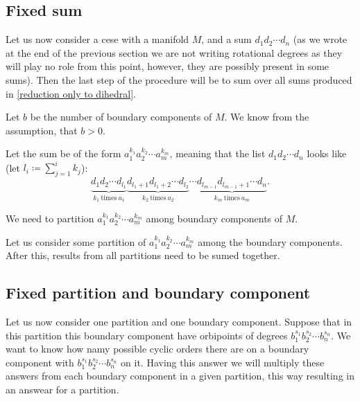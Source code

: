 \subsection{Fixed sum}

Let us now consider a cese with a manifold $M$, and a sum $d_1d_2\cdots d_n$ (as we wrote 
at the end of the previous section we are not writing rotational degrees as 
they will play no role from this point, however, they are possibly present in some sums). 
Then the last step of the procedure will be to sum over all sums produced in 
\ref{reduction only to dihedral}. 



Let $b$ be the number of boundary components of $M$. We know from the assumption, that $b > 0$. 

Let the sum be of the form $a_1^{k_1}a_2^{k_2}\cdots a_m^{k_m}$, meaning that the 
list $d_1d_2\cdots d_n$ looks like (let $l_i \coloneqq \sum_{j = 1}^i k_j$):
\begin{equation}
\underbrace{d_1d_2\cdots d_{l_1}}_{k_1\ \mathrm{times}\ a_1} 
\underbrace{d_{l_1+1}d_{l_1+2}\cdots d_{l_2}}_{k_2\ \mathrm{times}\ a_2} \cdots 
\underbrace{d_{l_{m-1}}d_{l_{m-1}+1}\cdots d_n}_{k_m\ \mathrm{times}\ a_m}. 
\end{equation}

We need to partition $a_1^{k_1}a_2^{k_2}\cdots a_m^{k_m}$ among boundary 
components of $M$. 


Let us consider some partition of $a_1^{k_1}a_2^{k_2}\cdots a_m^{k_m}$ among the boundary 
components. After this, results from all partitions need to be sumed together. 



\subsection{Fixed partition and boundary component}
Let us now consider one partition and one boundary component. 
Suppose that in this partition this boundary component have orbipoints of degrees 
$b_1^{s_1}b_2^{s_2}\cdots b_n^{s_n}$.  
We want to know how namy possible cyclic orders there are on a boundary component with 
$b_1^{s_1}b_2^{s_2}\cdots b_n^{s_n}$ on it. 
Having this answer we will multiply these answers from each boundary component in 
a given partition, this way resulting in an answear for a partition. 

